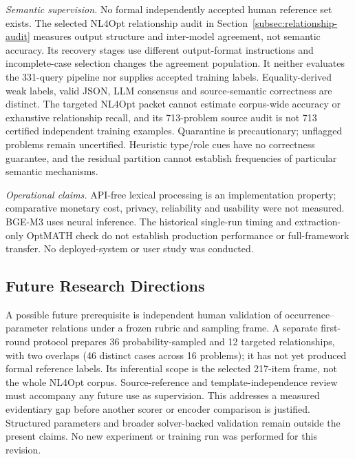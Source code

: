 \documentclass[pdflatex,sn-basic,Numbered]{sn-jnl}
\begin{document}
\emph{Semantic supervision.} No formal independently accepted human reference set exists. The selected NL4Opt relationship audit in Section~\ref{subsec:relationship-audit} measures output structure and inter-model agreement, not semantic accuracy. Its recovery stages use different output-format instructions and incomplete-case selection changes the agreement population. It neither evaluates the 331-query pipeline nor supplies accepted training labels. Equality-derived weak labels, valid JSON, LLM consensus and source-semantic correctness are distinct. The targeted NL4Opt packet cannot estimate corpus-wide accuracy or exhaustive relationship recall, and its 713-problem source audit is not 713 certified independent training examples. Quarantine is precautionary; unflagged problems remain uncertified. Heuristic type/role cues have no correctness guarantee, and the residual partition cannot establish frequencies of particular semantic mechanisms.

\emph{Operational claims.} API-free lexical processing is an implementation property; comparative monetary cost, privacy, reliability and usability were not measured. BGE-M3 uses neural inference. The historical single-run timing and extraction-only OptMATH check do not establish production performance or full-framework transfer. No deployed-system or user study was conducted.
\subsection{Future Research Directions}
\label{subsec:future_work}

A possible future prerequisite is independent human validation of occurrence--parameter relations under a frozen rubric and sampling frame. A separate first-round protocol prepares 36 probability-sampled and 12 targeted relationships, with two overlaps (46 distinct cases across 16 problems); it has not yet produced formal reference labels. Its inferential scope is the selected 217-item frame, not the whole NL4Opt corpus. Source-reference and template-independence review must accompany any future use as supervision. This addresses a measured evidentiary gap before another scorer or encoder comparison is justified. Structured parameters and broader solver-backed validation remain outside the present claims. No new experiment or training run was performed for this revision.
\end{document}
